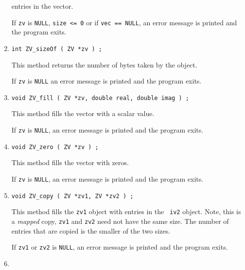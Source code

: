 \begin{enumerate}
entries in the vector.
\par {}
If {\tt zv} is {\tt NULL}, {\tt size <= 0} or if {\tt vec == NULL}, 
an error message is printed and the program exits.
\item
\begin{verbatim}
int ZV_sizeOf ( ZV *zv ) ;
\end{verbatim}
This method returns the number of bytes taken by the object.
\par {}
If {\tt zv} is {\tt NULL}
an error message is printed and the program exits.
\item
\begin{verbatim}
void ZV_fill ( ZV *zv, double real, double imag ) ;
\end{verbatim}
This method fills the vector with a scalar value.
\par {}
If {\tt zv} is {\tt NULL},
an error message is printed and the program exits.
\item
\begin{verbatim}
void ZV_zero ( ZV *zv ) ;
\end{verbatim}
This method fills the vector with zeros.
\par {}
If {\tt zv} is {\tt NULL},
an error message is printed and the program exits.
\item
\begin{verbatim}
void ZV_copy ( ZV *zv1, ZV *zv2 ) ;
\end{verbatim}
This method fills the {\tt zv1} object with entries in the {\tt
iv2} object.
Note, this is a {\it mapped} copy, {\tt zv1} and {\tt zv2} need not
have the same size.
The number of entries that are copied is the smaller of the two sizes.
\par {}
If {\tt zv1} or {\tt zv2} is {\tt NULL},
an error message is printed and the program exits.
\item
\begin{verbatim}

\end{verbatim}
\end{enumerate}
